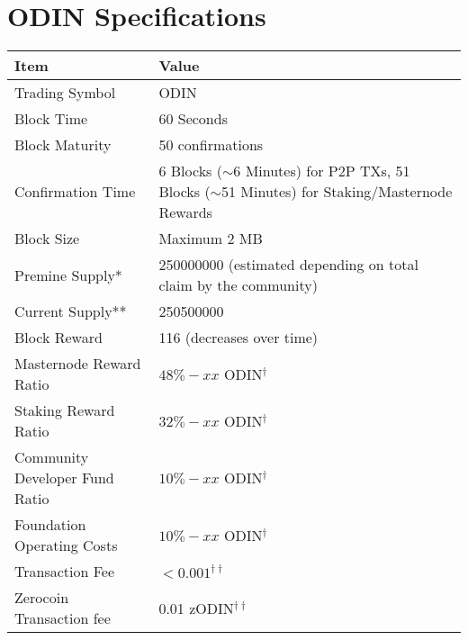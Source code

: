 \section{​ODIN Specifications}\hypertarget{specifications}{}
\begin{center}
\begin{adjustbox}{max width=\textwidth}
\begin{threeparttable}
\renewcommand{\arraystretch}{1.4}
\begin{tabular}{p{6.5cm} p{8cm}}
\hline
Item & Value \\
\hline
\hline
Trading Symbol                          & ODIN                  \\

Block Time                              & 60 Seconds            \\

Block Maturity                          & 50 confirmations      \\

Confirmation Time       & 6 Blocks ($\sim$6 Minutes) for P2P TXs, 51 Blocks ($\sim$51 Minutes) for Staking/Masternode Rewards\\

Block Size              & Maximum 2 MB \\

Premine Supply*          & \num{250000000} (estimated depending on total claim by the community) \tabularnewline

Current Supply**          & \num{250500000} \\

Block Reward            & 116 (decreases over time) \\

Masternode Reward Ratio & $48\% - xx$ ODIN$^\dag$\\

Staking Reward Ratio    & $32\% - xx$ ODIN$^\dag$ \\

Community Developer Fund Ratio & $10\% - xx$ ODIN$^\dag$ \\

Foundation Operating Costs     & $10\% - xx$ ODIN$^\dag$ \\

Transaction Fee         & $< 0.001^{\dag\dag}$ \\

Zerocoin Transaction fee & 0.01 zODIN$^{\dag\dag}$ \\


\end{tabular}
\end{threeparttable}
\end{adjustbox}
\end{center}
